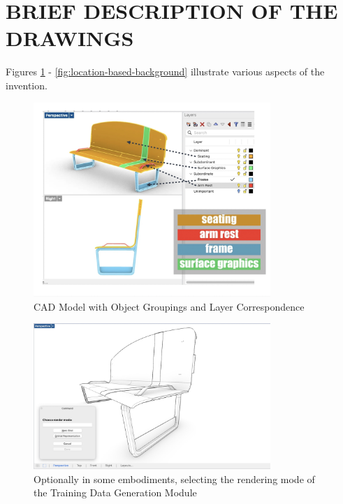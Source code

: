\documentclass[12pt]{article}
\begin{document}
\section{BRIEF DESCRIPTION OF THE DRAWINGS}
Figures \ref{fig:cad_model_groupings} - \ref{fig:location-based-background} illustrate various aspects of the invention.

\begin{figure}[h]
    \centering
    \includegraphics[width=0.8\textwidth]{figures/figure-perspective-right-layers-colors-labled-arrows-2.jpg}
    \caption{CAD Model with Object Groupings and Layer Correspondence}
    \label{fig:cad_model_groupings}
\end{figure}

\begin{figure}[h]
    \centering
    \includegraphics[width=0.8\textwidth]{figures/figure-process-choose-render-mode-monochrome.jpg} 
    \caption{Optionally in some embodiments, selecting the rendering mode of the Training Data Generation Module}
    \label{fig:render_mode_selection}
\end{figure}
\end{document}
